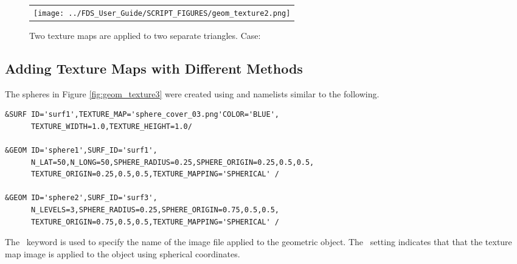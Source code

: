 \documentclass[11pt]{book}
\begin{document}
\begin{figure}[!ht]
\begin{center}
\begin{tabular}{c}
 \texttt{[image: ../FDS\_User\_Guide/SCRIPT\_FIGURES/geom\_texture2.png]}
  \end{tabular}
\end{center}
 \caption[Applying multiple texture maps to a  surface]{Two texture maps are applied to two separate triangles.  Case: }
\label{fig:geom_texture2}
\end{figure}

\FloatBarrier

\subsection{Adding Texture Maps with Different Methods}

The spheres in Figure \ref{fig:geom_texture3} were created using  and  namelists similar to the following.
\begin{lstlisting}
&SURF ID='surf1',TEXTURE_MAP='sphere_cover_03.png'COLOR='BLUE',
      TEXTURE_WIDTH=1.0,TEXTURE_HEIGHT=1.0/

&GEOM ID='sphere1',SURF_ID='surf1',
      N_LAT=50,N_LONG=50,SPHERE_RADIUS=0.25,SPHERE_ORIGIN=0.25,0.5,0.5,
      TEXTURE_ORIGIN=0.25,0.5,0.5,TEXTURE_MAPPING='SPHERICAL' /

&GEOM ID='sphere2',SURF_ID='surf3',
      N_LEVELS=3,SPHERE_RADIUS=0.25,SPHERE_ORIGIN=0.75,0.5,0.5,
      TEXTURE_ORIGIN=0.75,0.5,0.5,TEXTURE_MAPPING='SPHERICAL' /
\end{lstlisting}
The \ keyword is used to specify the name of the image file applied to the geometric object. The \ setting indicates that that the texture map image is applied to the object using spherical coordinates.
\end{document}
